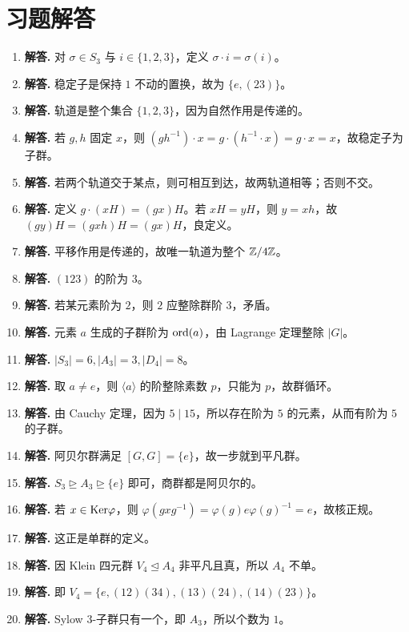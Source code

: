 \section*{习题解答}
\begin{enumerate}[label=\textbf{\arabic*.}, leftmargin=*, itemsep=1em]
\item \textbf{解答.} 对 $\sigma\in S_3$ 与 $i\in\{1,2,3\}$，定义 $\sigma\cdot i=\sigma(i)$。
\item \textbf{解答.} 稳定子是保持 $1$ 不动的置换，故为 $\{e,(23)\}$。
\item \textbf{解答.} 轨道是整个集合 $\{1,2,3\}$，因为自然作用是传递的。
\item \textbf{解答.} 若 $g,h$ 固定 $x$，则 $(gh^{-1})\cdot x=g\cdot(h^{-1}\cdot x)=g\cdot x=x$，故稳定子为子群。
\item \textbf{解答.} 若两个轨道交于某点，则可相互到达，故两轨道相等；否则不交。
\item \textbf{解答.} 定义 $g\cdot(xH)=(gx)H$。若 $xH=yH$，则 $y=xh$，故 $(gy)H=(gxh)H=(gx)H$，良定义。
\item \textbf{解答.} 平移作用是传递的，故唯一轨道为整个 $\mathbb{Z}/4\mathbb{Z}$。
\item \textbf{解答.} $(123)$ 的阶为 $3$。
\item \textbf{解答.} 若某元素阶为 $2$，则 $2$ 应整除群阶 $3$，矛盾。
\item \textbf{解答.} 元素 $a$ 生成的子群阶为 $\mathrm{ord}(a)$，由 Lagrange 定理整除 $|G|$。
\item \textbf{解答.} $|S_3|=6,|A_3|=3,|D_4|=8$。
\item \textbf{解答.} 取 $a\ne e$，则 $\langle a\rangle$ 的阶整除素数 $p$，只能为 $p$，故群循环。
\item \textbf{解答.} 由 Cauchy 定理，因为 $5\mid15$，所以存在阶为 $5$ 的元素，从而有阶为 $5$ 的子群。
\item \textbf{解答.} 阿贝尔群满足 $[G,G]=\{e\}$，故一步就到平凡群。
\item \textbf{解答.} $S_3\trianglerighteq A_3\trianglerighteq\{e\}$ 即可，商群都是阿贝尔的。
\item \textbf{解答.} 若 $x\in\mathrm{Ker}\varphi$，则 $\varphi(gxg^{-1})=\varphi(g)e\varphi(g)^{-1}=e$，故核正规。
\item \textbf{解答.} 这正是单群的定义。
\item \textbf{解答.} 因 Klein 四元群 $V_4\trianglelefteq A_4$ 非平凡且真，所以 $A_4$ 不单。
\item \textbf{解答.} 即 $V_4=\{e,(12)(34),(13)(24),(14)(23)\}$。
\item \textbf{解答.} Sylow $3$-子群只有一个，即 $A_3$，所以个数为 $1$。

\end{enumerate}
